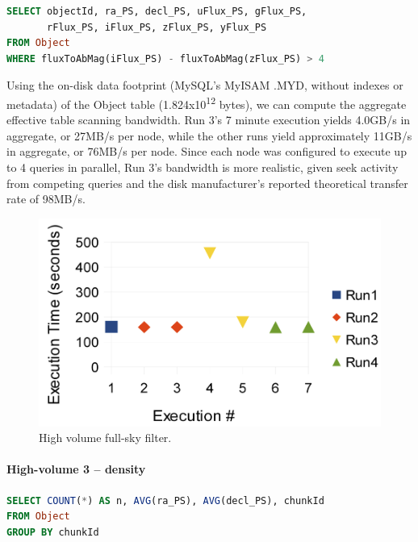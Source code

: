 \documentclass[DM,lsstdraft,toc]{lsstdoc}
\begin{document}
\begin{lstlisting}[language=SQL]
SELECT objectId, ra_PS, decl_PS, uFlux_PS, gFlux_PS,
       rFlux_PS, iFlux_PS, zFlux_PS, yFlux_PS
FROM Object
WHERE fluxToAbMag(iFlux_PS) - fluxToAbMag(zFlux_PS) > 4
\end{lstlisting}

Using the on-disk data footprint (MySQL's MyISAM .MYD, without indexes
or metadata) of the Object table (1.824x10\textsuperscript{12} bytes),
we can compute the aggregate effective table scanning bandwidth. Run 3's
7 minute execution yields 4.0GB/s in aggregate, or 27MB/s per node,
while the other runs yield approximately 11GB/s in aggregate, or 76MB/s
per node. Since each node was configured to execute up to 4 queries in
parallel, Run 3's bandwidth is more realistic, given seek activity from
competing queries and the disk manufacturer's reported theoretical
transfer rate of 98MB/s.

\begin{figure}[H]
\centering
\includegraphics{_static/150_node_high_volume_full_sky.png}
\caption{High volume full-sky filter.}
\end{figure}

\paragraph{High-volume 3 -- density}\label{high-volume-3-density}

\begin{lstlisting}[language=SQL]
SELECT COUNT(*) AS n, AVG(ra_PS), AVG(decl_PS), chunkId
FROM Object
GROUP BY chunkId
\end{lstlisting}
\end{document}
